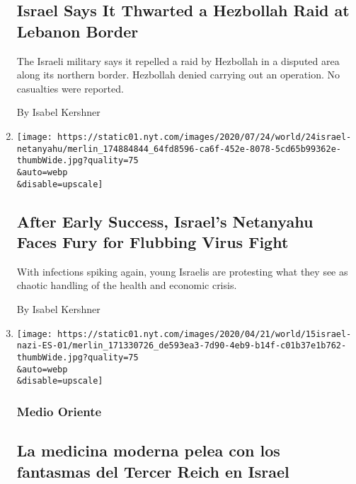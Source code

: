 \begin{enumerate}
{  \subsection{Israel Says It Thwarted a Hezbollah Raid at Lebanon
  Border}\label{israel-says-it-thwarted-a-hezbollah-raid-at-lebanon-border}}

  The Israeli military says it repelled a raid by Hezbollah in a
  disputed area along its northern border. Hezbollah denied carrying out
  an operation. No casualties were reported.

  By Isabel Kershner
\item
  \href{/2020/07/24/world/middleeast/israel-virus-protests-netanyahu.html}{}

  \texttt{[image: https://static01.nyt.com/images/2020/07/24/world/24israel-netanyahu/merlin\_174884844\_64fd8596-ca6f-452e-8078-5cd65b99362e-thumbWide.jpg?quality=75\\\&auto=webp\\\&disable=upscale]}

  \hypertarget{after-early-success-israels-netanyahu-faces-fury-for-flubbing-virus-fight}{%
  \subsection{After Early Success, Israel's Netanyahu Faces Fury for
  Flubbing Virus
  Fight}\label{after-early-success-israels-netanyahu-faces-fury-for-flubbing-virus-fight}}

  With infections spiking again, young Israelis are protesting what they
  see as chaotic handling of the health and economic crisis.

  By Isabel Kershner
\item
  \href{/es/2020/05/15/espanol/mundo/libro-nazi-israel-medicina.html}{}

  \texttt{[image: https://static01.nyt.com/images/2020/04/21/world/15israel-nazi-ES-01/merlin\_171330726\_de593ea3-7d90-4eb9-b14f-c01b37e1b762-thumbWide.jpg?quality=75\\\&auto=webp\\\&disable=upscale]}

  \hypertarget{medio-oriente}{%
  \subsubsection{Medio Oriente}\label{medio-oriente}}

  \hypertarget{la-medicina-moderna-pelea-con-los-fantasmas-del-tercer-reich-en-israel}{%
  \subsection{La medicina moderna pelea con los fantasmas del Tercer
  Reich en
  Israel}\label{la-medicina-moderna-pelea-con-los-fantasmas-del-tercer-reich-en-israel}}


\end{enumerate}
